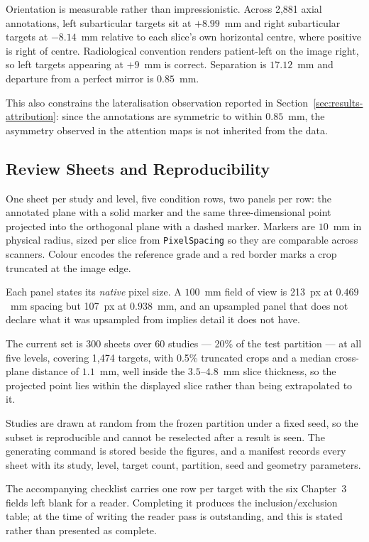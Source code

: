 \documentclass[12pt,a4paper]{report}
\begin{document}
Orientation is measurable rather than impressionistic. Across 2{,}881 axial
annotations, left subarticular targets sit at $+8.99$~mm and right subarticular
targets at $-8.14$~mm relative to each slice's own horizontal centre, where
positive is right of centre. Radiological convention renders patient-left on the
image right, so left targets appearing at $+9$~mm is correct. Separation is
$17.12$~mm and departure from a perfect mirror is $0.85$~mm.

This also constrains the lateralisation observation reported in
Section~\ref{sec:results-attribution}: since the annotations are symmetric to
within $0.85$~mm, the asymmetry observed in the attention maps is not inherited
from the data.

\subsection{Review Sheets and Reproducibility}

One sheet per study and level, five condition rows, two panels per row: the
annotated plane with a solid marker and the same three-dimensional point
projected into the orthogonal plane with a dashed marker. Markers are $10$~mm in
physical radius, sized per slice from \texttt{PixelSpacing} so they are
comparable across scanners. Colour encodes the reference grade and a red border
marks a crop truncated at the image edge.

Each panel states its \emph{native} pixel size. A $100$~mm field of view is
213~px at $0.469$~mm spacing but 107~px at $0.938$~mm, and an upsampled panel
that does not declare what it was upsampled from implies detail it does not
have.

The current set is 300 sheets over 60 studies --- 20\% of the test partition ---
at all five levels, covering 1{,}474 targets, with 0.5\% truncated crops and a
median cross-plane distance of $1.1$~mm, well inside the $3.5$--$4.8$~mm slice
thickness, so the projected point lies within the displayed slice rather than
being extrapolated to it.

Studies are drawn at random from the frozen partition under a fixed seed, so the
subset is reproducible and cannot be reselected after a result is seen. The
generating command is stored beside the figures, and a manifest records every
sheet with its study, level, target count, partition, seed and geometry
parameters.

The accompanying checklist carries one row per target with the six Chapter~3
fields left blank for a reader. Completing it produces the inclusion/exclusion
table; at the time of writing the reader pass is outstanding, and this is stated
rather than presented as complete.
\end{document}
